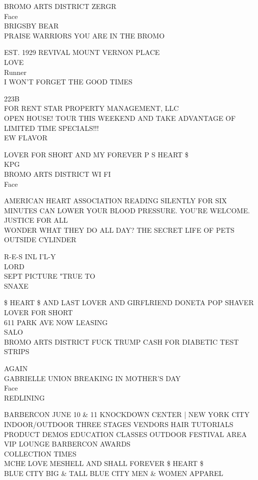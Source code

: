 \documentclass[10pt,letterpaper]{article}
\begin{document}
BROMO ARTS DISTRICT ZERGR\\
Face\\
BRIGSBY BEAR\\
PRAISE WARRIORS YOU ARE IN THE BROMO

EST. 1929 REVIVAL MOUNT VERNON PLACE\\
LOVE\\
Runner\\
I WON'T FORGET THE GOOD TIMES

223B\\
FOR RENT STAR PROPERTY MANAGEMENT, LLC\\
OPEN HOUSE!  TOUR THIS WEEKEND AND TAKE ADVANTAGE OF LIMITED TIME SPECIALS!!!\\
EW FLAVOR

LOVER FOR SHORT AND MY FOREVER P S HEART \$\\
KPG\\
BROMO ARTS DISTRICT WI FI\\
Face

AMERICAN HEART ASSOCIATION READING SILENTLY FOR SIX MINUTES CAN LOWER YOUR BLOOD PRESSURE.  YOU'RE WELCOME.\\
JUSTICE FOR ALL\\
WONDER WHAT THEY DO ALL DAY?  THE SECRET LIFE OF PETS\\
OUTSIDE CYLINDER

R{-}E{-}S INL I'L{-}Y\\
LORD\\
SEPT PICTURE "TRUE TO\\
SNAXE

\$ HEART \$ AND LAST LOVER AND GIRFLRIEND DONETA POP SHAVER LOVER FOR SHORT\\
611 PARK AVE NOW LEASING\\
SALO\\
BROMO ARTS DISTRICT FUCK TRUMP CASH FOR DIABETIC TEST STRIPS

AGAIN\\
GABRIELLE UNION BREAKING IN MOTHER'S DAY\\
Face\\
REDLINING

BARBERCON JUNE 10 \& 11 KNOCKDOWN CENTER | NEW YORK CITY INDOOR/OUTDOOR THREE STAGES VENDORS HAIR TUTORIALS PRODUCT DEMOS EDUCATION CLASSES OUTDOOR FESTIVAL AREA VIP LOUNGE BARBERCON AWARDS\\
COLLECTION TIMES\\
MCHE LOVE MESHELL AND SHALL FOREVER \$ HEART \$\\
BLUE CITY BIG \& TALL BLUE CITY MEN \& WOMEN APPAREL
\end{document}
